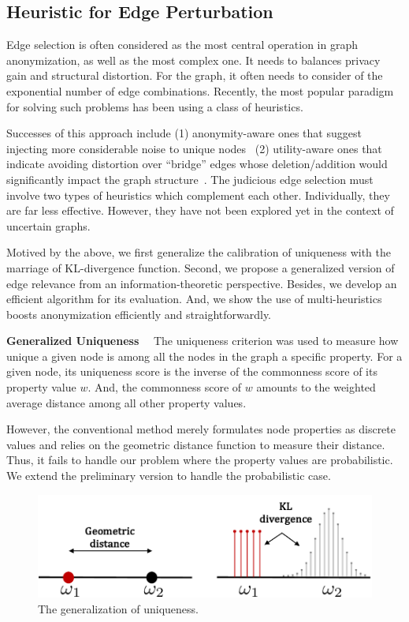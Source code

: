 \subsection{Heuristic for Edge Perturbation}
Edge selection is often considered as the most central operation in graph anonymization, as well as the most complex one. 
It needs to balances privacy gain and structural distortion. 
For the graph, it often needs to consider of the exponential number of edge combinations. 
Recently, the most popular paradigm for solving such problems has been using a class of heuristics. 

Successes of this approach include
(1) anonymity-aware ones that suggest injecting more considerable noise to unique nodes~\cite{Ying2009,Boldi_Injecting_2012,Hay_Anonymizing_2007} 
(2) utility-aware ones that indicate avoiding distortion over “bridge” edges whose deletion/addition would significantly impact the graph structure~\cite{Wang2011,Ninggal_Utility_2015}. 
The judicious edge selection must involve two types of heuristics which complement each other. 
Individually, they are far less effective. 
However, they have not been explored yet in the context of uncertain graphs.

Motived by the above, we first generalize the calibration of uniqueness with the marriage of KL-divergence function. 
Second, we propose a generalized version of edge relevance from an information-theoretic perspective.
Besides, we develop an efficient algorithm for its evaluation.
And, we show the use of multi-heuristics boosts anonymization efficiently and straightforwardly.

\textbf{Generalized Uniqueness}~~
The uniqueness criterion was used to measure how unique a given node is among all the nodes in the graph {\wrt} a specific property. 
For a given node, its uniqueness score is the inverse of the commonness score of its property value $w$.
And, the commonness score of $w$ amounts to the weighted average distance among all other property values.

However, the conventional method merely formulates node properties as discrete values and relies on the geometric distance function to measure their distance.  
Thus, it fails to handle our problem where the property values are probabilistic.
We extend the preliminary version to handle the probabilistic case. 

\begin{figure}[!htb]
  \centering
        \includegraphics[width=\linewidth]{ill/shift_distance.pdf}
    \caption{The generalization of uniqueness.}
\end{figure}

